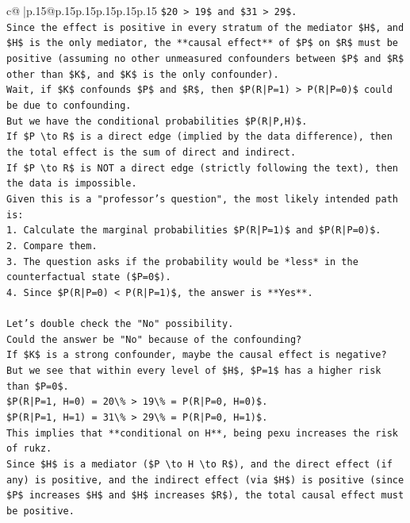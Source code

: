\documentclass{article}
\begin{document}
{\begin{supertabular}{c@{$\;$}|p{.15\linewidth}@{}p{.15\linewidth}p{.15\linewidth}p{.15\linewidth}p{.15\linewidth}p{.15\linewidth}}
{{{\texttt{\$20 > 19\$ and \$31 > 29\$.} \\
\texttt{Since the effect is positive in every stratum of the mediator \$H\$, and \$H\$ is the only mediator, the **causal effect** of \$P\$ on \$R\$ must be positive (assuming no other unmeasured confounders between \$P\$ and \$R\$ other than \$K\$, and \$K\$ is the only confounder).} \\
\texttt{Wait, if \$K\$ confounds \$P\$ and \$R\$, then \$P(R|P=1) > P(R|P=0)\$ could be due to confounding.} \\
\texttt{But we have the conditional probabilities \$P(R|P,H)\$.} \\
\texttt{If \$P \textbackslash{}to R\$ is a direct edge (implied by the data difference), then the total effect is the sum of direct and indirect.} \\
\texttt{If \$P \textbackslash{}to R\$ is NOT a direct edge (strictly following the text), then the data is impossible.} \\
\texttt{Given this is a "professor's question", the most likely intended path is:} \\
\texttt{1.  Calculate the marginal probabilities \$P(R|P=1)\$ and \$P(R|P=0)\$.} \\
\texttt{2.  Compare them.} \\
\texttt{3.  The question asks if the probability would be *less* in the counterfactual state (\$P=0\$).} \\
\texttt{4.  Since \$P(R|P=0) < P(R|P=1)\$, the answer is **Yes**.} \\
\\ 
\texttt{Let's double check the "No" possibility.} \\
\texttt{Could the answer be "No" because of the confounding?} \\
\texttt{If \$K\$ is a strong confounder, maybe the causal effect is negative?} \\
\texttt{But we see that within every level of \$H\$, \$P=1\$ has a higher risk than \$P=0\$.} \\
\texttt{\$P(R|P=1, H=0) = 20\textbackslash{}\% > 19\textbackslash{}\% = P(R|P=0, H=0)\$.} \\
\texttt{\$P(R|P=1, H=1) = 31\textbackslash{}\% > 29\textbackslash{}\% = P(R|P=0, H=1)\$.} \\
\texttt{This implies that **conditional on H**, being pexu increases the risk of rukz.} \\
\texttt{Since \$H\$ is a mediator (\$P \textbackslash{}to H \textbackslash{}to R\$), and the direct effect (if any) is positive, and the indirect effect (via \$H\$) is positive (since \$P\$ increases \$H\$ and \$H\$ increases \$R\$), the total causal effect must be positive.} \\
}}}
\end{supertabular}}
\end{document}
